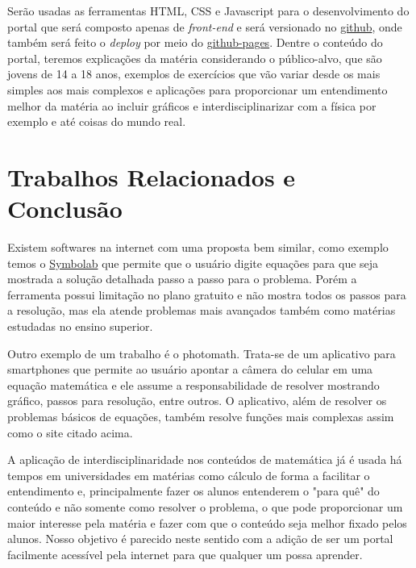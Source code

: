 \documentclass[12pt]{article}
\begin{document}
Serão usadas as ferramentas HTML, CSS e Javascript para o desenvolvimento do portal que será composto apenas de \textit{front-end} e será versionado no \href{https://github.com/Pedenite/PILC-eq}{github}, onde também será feito o \textit{deploy} por meio do \href{https://pedenite.github.io/PILC-eq/}{github-pages}. Dentre o conteúdo do portal, teremos explicações da matéria considerando o público-alvo, que são jovens de 14 a 18 anos, exemplos de exercícios que vão variar desde os mais simples aos mais complexos e aplicações para proporcionar um entendimento melhor da matéria ao incluir gráficos e interdisciplinarizar com a física por exemplo e até coisas do mundo real.

\section{Trabalhos Relacionados e Conclusão}
Existem softwares na internet com uma proposta bem similar, como exemplo temos o \href{https://pt.symbolab.com/}{Symbolab} que permite que o usuário digite equações para que seja mostrada a solução detalhada passo a passo para o problema. Porém a ferramenta possui limitação no plano gratuito e não mostra todos os passos para a resolução, mas ela atende problemas mais avançados também como matérias estudadas no ensino superior.

Outro exemplo de um trabalho é o photomath. Trata-se de um aplicativo para smartphones que permite ao usuário apontar a câmera do celular em uma equação matemática e ele assume a responsabilidade de resolver mostrando gráfico, passos para resolução, entre outros. O aplicativo, além de resolver os problemas básicos de equações, também resolve funções mais complexas assim como o site citado acima.

A aplicação de interdisciplinaridade nos conteúdos de matemática já é usada há tempos em universidades em matérias como cálculo de forma a facilitar o entendimento e, principalmente fazer os alunos entenderem o "para quê" do conteúdo e não somente como resolver o problema, o que pode proporcionar um maior interesse pela matéria e fazer com que o conteúdo seja melhor fixado pelos alunos. Nosso objetivo é parecido neste sentido com a adição de ser um portal facilmente acessível pela internet para que qualquer um possa aprender.
\end{document}
